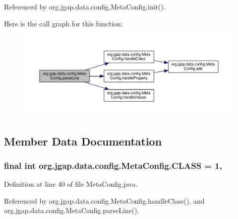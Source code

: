 Referenced by org.\-jgap.\-data.\-config.\-Meta\-Config.\-init().



Here is the call graph for this function\-:
\nopagebreak
\begin{figure}[H]
\begin{center}
\leavevmode
\includegraphics[width=350pt]{classorg_1_1jgap_1_1data_1_1config_1_1_meta_config_a40ab2cfd3becb39d8d9407f9778999e9_cgraph}
\end{center}
\end{figure}




\subsection{Member Data Documentation}
\hypertarget{classorg_1_1jgap_1_1data_1_1config_1_1_meta_config_a0c165ded2590ee31d13027973830bfc3}{
\subsubsection[{C\-L\-A\-S\-S}]{\setlength{\rightskip}{0pt plus 5cm}final int org.\-jgap.\-data.\-config.\-Meta\-Config.\-C\-L\-A\-S\-S = 1\hspace{0.3cm}{\ttfamily [static]}, {\ttfamily [private]}}}\label{classorg_1_1jgap_1_1data_1_1config_1_1_meta_config_a0c165ded2590ee31d13027973830bfc3}


Definition at line 40 of file Meta\-Config.\-java.



Referenced by org.\-jgap.\-data.\-config.\-Meta\-Config.\-handle\-Class(), and org.\-jgap.\-data.\-config.\-Meta\-Config.\-parse\-Line().

